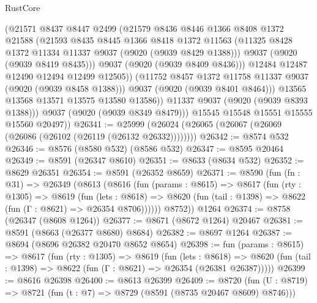 \begin{lexlean}{RustCore}
\begin{coremodule}
                    (@21571
                      @8437
                      @8447
                      @2499
                      (@21579
                        @8436
                        @8446
                        @1366
                        @8408
                        @1372
                        @21588
                        (@21593
                          @8435
                          @8445
                          @1366
                          @8418
                          @1372
                          @11563
                          (@11325 @8428 @1372 @11334 @11337 @9037 (@9020 (@9039 @8429 @1388)))
                          @9037
                          (@9020 (@9039 @8419 @8435)))
                        @9037
                        (@9020 (@9039 @8409 @8436)))
                      @12484
                      @12487
                      @12490
                      @12494
                      @12499
                      @12505))
                  (@11752 @8457 @1372 @11758 @11337 @9037 (@9020 (@9039 @8458 @1388)))
                  @9037
                  (@9020 (@9039 @8401 @8464)))
                @13565
                @13568
                @13571
                @13575
                @13580
                @13586))
            @11337
            @9037
            (@9020 (@9039 @8393 @1388)))
          @9037
          (@9020 (@9039 @8349 @8479)))
        @15545
        @15548
        @15551
        @15555
        @15560
        @20497))
@26341 := @25999 (@26024 (@26065 (@26067 (@26069 (@26086 (@26102 (@26119 (@26132 @26332))))))))
@26342 := @8574 @532
@26346 := @8576 (@8580 @532) (@8586 @532)
@26347 := @8595 @20464
@26349 := @8591 (@26347 @8610)
@26351 := @8633 (@8634 @532)
@26352 := @8629 @26351
@26354 := @8591 (@26352 @8659)
@26371 := @8590
    (fun (fn : @31) =>
    @26349
      (@8613
        (@8616
          (fun (params : @8615) =>
          @8617
            (fun (rty : @1305) =>
            @8619
              (fun (lets : @8618) =>
              @8620 (fun (tail : @1398) => @8622 (fun (Γ : @8621) => @26354 @8706))))))
        @8752))
    @1264
@26374 := @8758 (@26347 (@8608 @1264))
@26377 := @8671 (@8672 @1264) @20467
@26381 := @8591 (@8663 (@26377 @8680) @8684)
@26382 := @8697 @1264
@26387 := @8694 (@8696 @26382 @20470 @8652 @8654)
@26398 := fun (params : @8615) =>
  @8617
    (fun (rty : @1305) =>
    @8619
      (fun (lets : @8618) =>
      @8620 (fun (tail : @1398) => @8622 (fun (Γ : @8621) => @26354 (@26381 @26387)))))
@26399 := @8616 @26398
@26400 := @8613 @26399
@26409 := @8720
    (fun (U : @8719) => @8721 (fun (t : @7) => @8729 (@8591 (@8735 @20467 @8609) @8746)))

\end{coremodule}
\end{lexlean}
